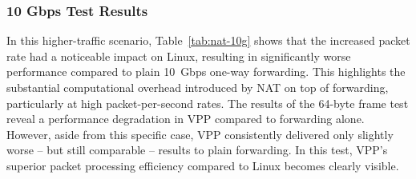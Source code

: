 \subsubsection{10 Gbps Test Results}

In this higher-traffic scenario, Table~\ref{tab:nat-10g} shows that the increased packet rate had a noticeable impact on Linux, 
resulting in significantly worse performance compared to plain 10~Gbps one-way forwarding.
This highlights the substantial computational overhead introduced by NAT on top of forwarding, particularly at high packet-per-second rates.
The results of the 64-byte frame test reveal a performance degradation in VPP compared to forwarding alone.  
However, aside from this specific case, VPP consistently delivered only slightly worse -- but still comparable -- results to plain forwarding.
In this test, VPP's superior packet processing efficiency compared to Linux becomes clearly visible.

